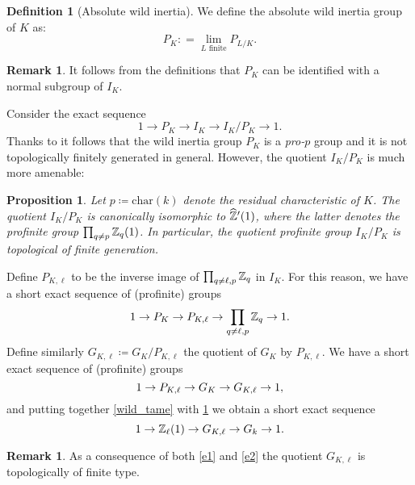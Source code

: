 \documentclass[10pt,a4paper]{amsart}
\numberwithin{equation}{subsection}
\theoremstyle{plain}
\newtheorem{prop}[theorem]{Proposition}
\theoremstyle{definition}
\newtheorem{defi}[theorem]{Definition}
\newtheorem{rema}[theorem]{Remark}
\theoremstyle{remark}
\numberwithin{equation}{section}
\begin{document}
\begin{defi}[Absolute wild inertia]
We define the absolute wild inertia group of $K$ as:
	\[
		P_K : = \lim_{L \text{ finite}} P_{L/K}.
	\] 
\end{defi}


\begin{rema}
It follows from the definitions that $P_K $ can be identified with a normal subgroup of $I_K$.
\end{rema}

Consider the exact sequence
	\begin{equation} \label{wild_tame}
		1 \to P_K \to I_K \to I_K / P_K \to 1.
	\end{equation}
Thanks to \cite[Lemma 53.13.6]{stacks} it follows that the wild inertia group $P_K$ is a \emph{pro-$p$} group and it is not topologically finitely generated in general. However, the quotient $I_K / P_K$ is much more amenable:

\begin{prop}{\cite[Corollary 13]{bommel}} \label{tame_mon} Let $p \coloneqq \mathrm{char}(k)$ denote the residual characteristic of $K$.
The quotient $I_K / P_K$ is canonically isomorphic to $\widehat{\mathbb Z}'(1)$, where the latter denotes the profinite group $\prod_{q \neq p} \mathbb Z_q(1)$. In particular, the quotient profinite group $I_K / P_K$ is topological of finite generation.
\end{prop}


Define $P_{K, \ell} $ to be the inverse image of $\prod_{q \neq \ell, p } \mathbb Z_q$ in $I_K$. For this reason, we have a short exact sequence of (profinite) groups
	\[
		1 \to P_K \to P_{K, \ell} \to \prod_{q \neq \ell, p } \mathbb Z_q \to 1.
	\]
Define similarly $G_{K, \ell} \coloneqq G_K / P_{K, \ell}$ the quotient of $G_K$ by $P_{K, \ell}$. We have a short exact sequence of (profinite) groups
	\begin{equation} \label{e1}
		1 \to P_{K, \ell} \to G_K \to G_{K, \ell} \to 1,
	\end{equation}
and putting together \eqref{wild_tame} with \cref{tame_mon} we obtain a short exact sequence
	\begin{equation} \label{e2}
		1 \to \mathbb Z_\ell(1) \to G_{K, \ell} \to G_k \to 1.
	\end{equation}
	
\begin{rema}
As a consequence of both \eqref{e1} and \eqref{e2} the quotient $G_{K, \ell}$ is topologically of finite type.
\end{rema}
\end{document}
